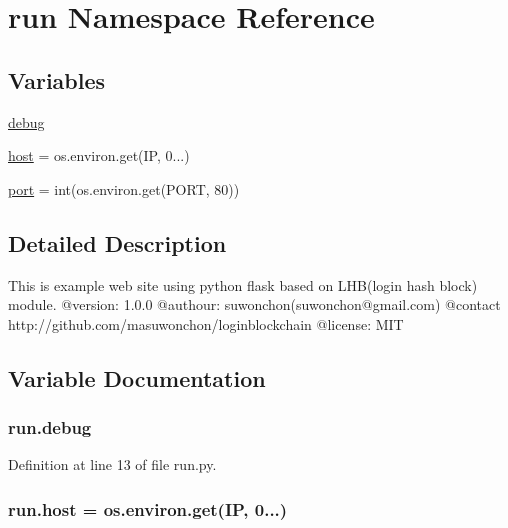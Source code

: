 \hypertarget{namespacerun}{}\section{run Namespace Reference}
\label{namespacerun}
\subsection*{Variables}
\begin{DoxyCompactItemize}
\item 
\hyperlink{namespacerun_a24785e11198aac41f0051e51857331aa}{debug}
\item 
\hyperlink{namespacerun_af7767eb404b922097d7206695c016bad}{host} = os.\+environ.\+get(\textquotesingle{}IP\textquotesingle{}, \textquotesingle{}0...\textquotesingle{})
\item 
\hyperlink{namespacerun_a7a6a5c33b9e900b36c2b941d5212210e}{port} = int(os.\+environ.\+get(\textquotesingle{}P\+O\+RT\textquotesingle{}, 80))
\end{DoxyCompactItemize}


\subsection{Detailed Description}
\begin{DoxyVerb}This is example web site using python flask based on LHB(login hash block) module.
@version: 1.0.0
@authour: suwonchon(suwonchon@gmail.com)
@contact http://github.com/masuwonchon/loginblockchain
@license: MIT
\end{DoxyVerb}
 

\subsection{Variable Documentation}
\subsubsection[{\texorpdfstring{debug}{debug}}]{\setlength{\rightskip}{0pt plus 5cm}run.\+debug}\hypertarget{namespacerun_a24785e11198aac41f0051e51857331aa}{}\label{namespacerun_a24785e11198aac41f0051e51857331aa}


Definition at line 13 of file run.\+py.

\subsubsection[{\texorpdfstring{host}{host}}]{\setlength{\rightskip}{0pt plus 5cm}run.\+host = os.\+environ.\+get(\textquotesingle{}IP\textquotesingle{}, \textquotesingle{}0...\textquotesingle{})}\hypertarget{namespacerun_af7767eb404b922097d7206695c016bad}{}\label{namespacerun_af7767eb404b922097d7206695c016bad}


